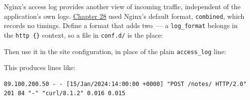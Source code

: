 Nginx's access log provides another view of incoming traffic, independent of the application's own logs. \hyperref[ch:28-traffic-routing]{Chapter 28} used Nginx's default format, \texttt{combined}, which records no timings. Define a format that adds two~--- a \texttt{log\_format} belongs in the \texttt{http\ \{\}} context, so a file in \texttt{conf.d/} is the place:

\begin{codebox}[short]

\begin{Shaded}
\begin{Highlighting}[]
\end{Highlighting}
\end{Shaded}

\end{codebox}

\noindent{}Then use it in the site configuration, in place of the plain \texttt{access\_log} line:

\begin{codebox}[short]

\begin{Shaded}
\begin{Highlighting}[]
\end{Highlighting}
\end{Shaded}

\end{codebox}

\noindent{}This produces lines like:

\begin{outputbox}[short]
\begin{Verbatim}[fontsize=\codesize, breaklines, breakanywhere, breaksymbolleft={\tiny\textcolor{muted}{$\hookrightarrow$}}]
89.100.200.50 - - [15/Jan/2024:14:00:00 +0000] "POST /notes/ HTTP/2.0" 201 84 "-" "curl/8.1.2" 0.016 0.015
\end{Verbatim}
\end{outputbox}

